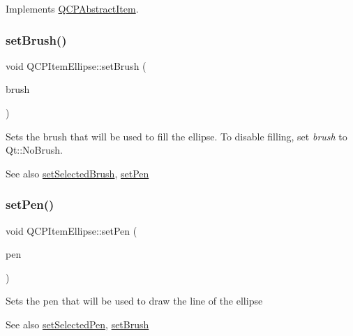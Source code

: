 Implements \mbox{\hyperlink{class_q_c_p_abstract_item_ae41d0349d68bb802c49104afd100ba2a}{Q\+C\+P\+Abstract\+Item}}.

\mbox{\label{class_q_c_p_item_ellipse_a49fc74e6965834e873d027d026def798}} 
\subsubsection{\texorpdfstring{setBrush()}{setBrush()}}
{\footnotesize\ttfamily void Q\+C\+P\+Item\+Ellipse\+::set\+Brush (\begin{DoxyParamCaption}\item[{const Q\+Brush \&}]{brush }\end{DoxyParamCaption})}

Sets the brush that will be used to fill the ellipse. To disable filling, set {\itshape brush} to Qt\+::\+No\+Brush.

\begin{DoxySeeAlso}{See also}
\mbox{\hyperlink{class_q_c_p_item_ellipse_a9693501cfaa43a099655c75bed0dab3f}{set\+Selected\+Brush}}, \mbox{\hyperlink{class_q_c_p_item_ellipse_adb81a663ed2420fcfa011e49f678d1a6}{set\+Pen}} 
\end{DoxySeeAlso}
\mbox{\label{class_q_c_p_item_ellipse_adb81a663ed2420fcfa011e49f678d1a6}} 
\subsubsection{\texorpdfstring{setPen()}{setPen()}}
{\footnotesize\ttfamily void Q\+C\+P\+Item\+Ellipse\+::set\+Pen (\begin{DoxyParamCaption}\item[{const Q\+Pen \&}]{pen }\end{DoxyParamCaption})}

Sets the pen that will be used to draw the line of the ellipse

\begin{DoxySeeAlso}{See also}
\mbox{\hyperlink{class_q_c_p_item_ellipse_a6c542fba1dc918041c583f58a50dde99}{set\+Selected\+Pen}}, \mbox{\hyperlink{class_q_c_p_item_ellipse_a49fc74e6965834e873d027d026def798}{set\+Brush}} 
\end{DoxySeeAlso}
\mbox{\label{class_q_c_p_item_ellipse_a9693501cfaa43a099655c75bed0dab3f}} 
